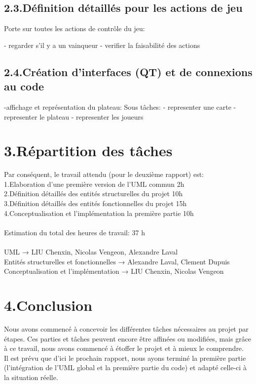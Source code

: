 \documentclass[a4paper]{article}
\begin{document}
\subsection*{2.3.Définition détaillés pour les actions de jeu}

Porte sur toutes les actions de contrôle du jeu:

- regarder s’il y a un vainqueur
- verifier la faisabilité des actions

\subsection*{2.4.Création d'interfaces (QT) et de connexions au code}
-affichage et représentation  du plateau:
 Sous tâches:
 - representer une carte
 - representer le plateau
 - representer les joueurs



\section*{3.Répartition des tâches}
Par conséquent, le travail attendu (pour le deuxième rapport) est:\\
1.Elaboration d'une première version de l'UML commun 2h\\
2.Définition détaillés des entités structurelles du projet 10h\\
3.Définition détaillés des entités fonctionnelles du projet 15h\\
4.Conceptualisation et l’implémentation la première partie 10h\\
\\
Estimation du total des heures de travail: 37 h\\
\\
UML → LIU Chenxin, Nicolas Vengeon, Alexandre Laval\\
Entités structurelles et fonctionnelles → Alexandre Laval, 	Clement Dupuis\\
Conceptualisation et l’implémentation → LIU Chenxin, Nicolas Vengeon\\

\section*{4.Conclusion}
Nous avons commencé à concevoir les différentes tâches nécessaires au projet par étapes. Ces parties et tâches peuvent encore être affinées ou modifiées, mais grâce à ce travail, nous avons commencé à étoffer le projet et à mieux le comprendre.\\
 Il est prévu que d'ici le prochain rapport, nous ayons terminé la première partie (l'intégration de l'UML global et la première partie du code) et adapté celle-ci à la situation réelle.





\end{document}
